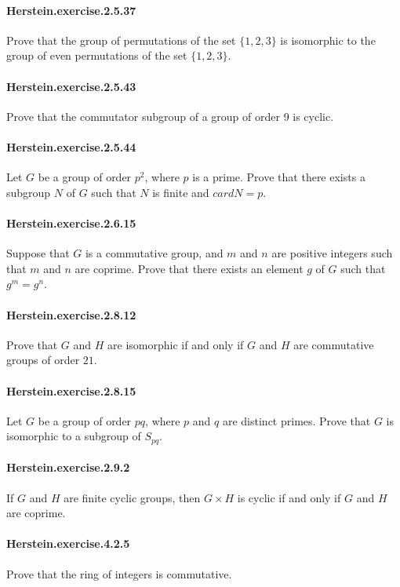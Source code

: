 \documentclass{article}
\begin{document}
\paragraph{Herstein.exercise.2.5.37} Prove that the group of permutations of the set $\{1, 2, 3\}$ is isomorphic to the group of even permutations of the set $\{1, 2, 3\}$.

\paragraph{Herstein.exercise.2.5.43} Prove that the commutator subgroup of a group of order 9 is cyclic.

\paragraph{Herstein.exercise.2.5.44} Let $G$ be a group of order $p^2$, where $p$ is a prime. Prove that there exists a subgroup $N$ of $G$ such that $N$ is finite and $card N = p$.

\paragraph{Herstein.exercise.2.6.15} Suppose that $G$ is a commutative group, and $m$ and $n$ are positive integers such that $m$ and $n$ are coprime. Prove that there exists an element $g$ of $G$ such that $g^m = g^n$.

\paragraph{Herstein.exercise.2.8.12} Prove that $G$ and $H$ are isomorphic if and only if $G$ and $H$ are commutative groups of order $21$.

\paragraph{Herstein.exercise.2.8.15} Let $G$ be a group of order $pq$, where $p$ and $q$ are distinct primes. Prove that $G$ is isomorphic to a subgroup of $S_{pq}$.

\paragraph{Herstein.exercise.2.9.2} If $G$ and $H$ are finite cyclic groups, then $G \times H$ is cyclic if and only if $G$ and $H$ are coprime.

\paragraph{Herstein.exercise.4.2.5} Prove that the ring of integers is commutative.
\end{document}
